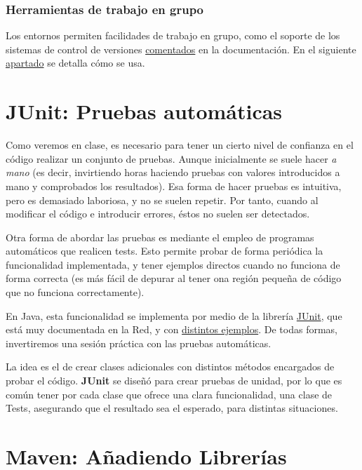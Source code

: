 \documentclass[11pt]{article}
\begin{document}
\subsubsection{Herramientas de trabajo en grupo}
\label{sec-3-2-6}




Los entornos permiten facilidades de trabajo en grupo, como el soporte de los sistemas de control de versiones
\hyperref[svc]{comentados} en la documentación. En el siguiente \hyperref[soporte_svn]{apartado} se detalla cómo se usa.
\section{JUnit: Pruebas automáticas}
\label{sec-4}




Como veremos en clase, es necesario para tener un cierto nivel de confianza en el código realizar un conjunto
de pruebas. Aunque inicialmente se suele hacer \emph{a mano} (es decir, invirtiendo horas haciendo pruebas con
valores introducidos a mano y comprobados los resultados). Esa forma de hacer pruebas es intuitiva, pero es
demasiado laboriosa, y no se suelen repetir. Por tanto, cuando al modificar el código e introducir errores, éstos
no suelen ser detectados. 


Otra forma de abordar las pruebas es mediante el empleo de programas automáticos que realicen tests. Esto permite
probar de forma periódica la funcionalidad implementada, y tener ejemplos directos cuando no funciona de forma
correcta (es más fácil de depurar al tener ona región pequeña de código que no funciona correctamente). 


En Java, esta funcionalidad se implementa por medio de la librería \href{http://junit.sourceforge.net/}{JUnit}, que está muy documentada en la
Red, y con \href{http://www.slideshare.net/tom.zimmermann/unit-testing-with-junit}{distintos ejemplos}. De todas formas, invertiremos una sesión práctica con las pruebas automáticas.


La idea es el de crear clases adicionales con distintos métodos encargados de probar el código. \textbf{JUnit} se diseñó
para crear pruebas de unidad, por lo que es común tener por cada clase que ofrece una clara funcionalidad, una
clase de Tests, asegurando que el resultado sea el esperado, para distintas situaciones.  
\section{Maven: Añadiendo Librerías}
\label{sec-5}
\label{maven}
\end{document}
